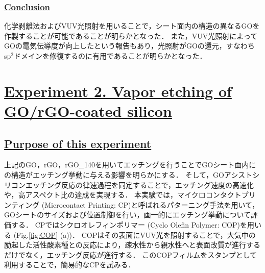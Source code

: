 \documentclass[platex,dvipdfmx]{jlreq}			%
\begin{document}
\subsubsection*{\ul{Conclusion}}
化学剥離法およびVUV光照射を用いることで，シート面内の構造の異なるGOを作製することが可能であることが明らかとなった．
また，VUV光照射によってGOの電気伝導度が向上したという報告もあり，光照射がGOの還元，すなわちsp$^2$ドメインを修復するのに有用であることが明らかとなった．

\section*{\ul{Experiment 2. Vapor etching of GO/rGO-coated silicon}}

\subsection*{\ul{Purpose of this experiment}}
上記のGO，rGO，rGO\_140を用いてエッチングを行うことでGOシート面内にの構造がエッチング挙動に与える影響を明らかにする．
そして，GOアシストシリコンエッチング反応の律速過程を同定することで，エッチング速度の高速化や，高アスペクト比の達成を実現する．
本実験では，マイクロコンタクトプリンティング (Microcontact Printing: \textmu CP)と呼ばれるパターニング手法を用いて，GOシートのサイズおよび位置制御を行い，画一的にエッチング挙動について評価する．
\textmu CPではシクロオレフィンポリマー (Cyclo Olefin Polymer: COP)を用いる (Fig.\ref{fig:COP} (a))．
COPはその表面にVUV光を照射することで，大気中の励起した活性酸素種との反応により，疎水性から親水性へと表面改質が進行するだけでなく，エッチング反応が進行する．
このCOPフィルムをスタンプとして利用することで，簡易的な\textmu CPを試みる．
\end{document}
